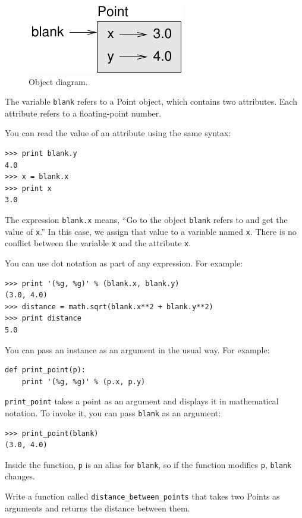 \documentclass[10pt]{book}
\begin{document}
\begin{CJK}{UTF8}{gbsn}
\begin{figure}
\centerline
{\includegraphics[scale=0.8]{figs/point.pdf}}
\caption{Object diagram.}
\label{fig.point}
\end{figure}


The variable {\tt blank} refers to a Point object, which
contains two attributes.  Each attribute refers to a
floating-point number.

You can read the value of an attribute using the same syntax:

\begin{verbatim}
>>> print blank.y
4.0
>>> x = blank.x
>>> print x
3.0
\end{verbatim}
%
The expression {\tt blank.x} means, ``Go to the object {\tt blank}
refers to and get the value of {\tt x}.'' In this case, we assign that
value to a variable named {\tt x}.  There is no conflict between
the variable {\tt x} and the attribute {\tt x}.

You can use dot notation as part of any expression.  For example:

\begin{verbatim}
>>> print '(%g, %g)' % (blank.x, blank.y)
(3.0, 4.0)
>>> distance = math.sqrt(blank.x**2 + blank.y**2)
>>> print distance
5.0
\end{verbatim}
%
You can pass an instance as an argument in the usual way.
For example:

\begin{verbatim}
def print_point(p):
    print '(%g, %g)' % (p.x, p.y)
\end{verbatim}
%
\verb"print_point" takes a point as an argument and displays it in
mathematical notation.  To invoke it, you can pass {\tt blank} as
an argument:

\begin{verbatim}
>>> print_point(blank)
(3.0, 4.0)
\end{verbatim}
%
Inside the function, {\tt p} is an alias for {\tt blank}, so if
the function modifies {\tt p}, {\tt blank} changes.


\begin{exercise}

Write a function called \verb"distance_between_points" that takes two
Points as arguments and returns the distance between them.


\end{exercise}
\end{CJK}
\end{document}
